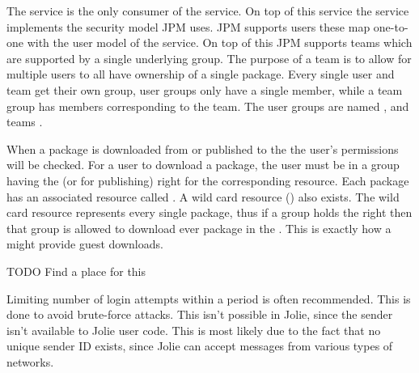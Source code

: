 The \registry service is the only consumer of the \security service. On top of
this service the \registry service implements the security model JPM uses. JPM
supports users these map one-to-one with the user model of the \security
service. On top of this JPM supports teams which are supported by a single
underlying group. The purpose of a team is to allow for multiple users to all
have ownership of a single package. Every single user and team get their own
group, user groups only have a single member, while a team group has members
corresponding to the team. The user groups are named , and
teams .

When a package is downloaded from or published to the \registry the user's
permissions will be checked. For a user to download a package, the user must be
in a group having the  (or  for publishing) right for
the corresponding resource. Each package has an associated resource called
. A wild card resource () also exists.
The wild card resource represents every single package, thus if a group holds
the  right then that group is allowed to download ever
package in the \registry. This is exactly how a \registry might provide guest
downloads.

TODO Find a place for this

Limiting number of login attempts within a period is often recommended. This is
done to avoid brute-force attacks. This isn't possible in Jolie, since the
sender isn't available to Jolie user code. This is most likely due to the fact
that no unique sender ID exists, since Jolie can accept messages from various
types of networks.
